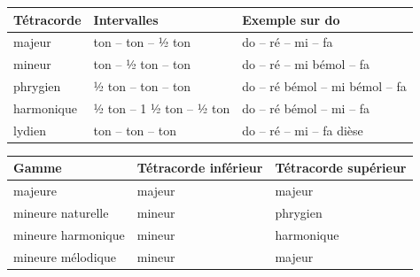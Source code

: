 
\begin{tabular}{@{}l l l@{}}
\toprule
\textbf{Tétracorde} & \textbf{Intervalles} & \textbf{Exemple sur do} \\
\midrule
majeur & ton -- ton -- ½ ton & do -- ré -- mi -- fa \\
mineur & ton -- ½ ton -- ton & do -- ré -- mi bémol -- fa \\
phrygien & ½ ton -- ton -- ton & do -- ré bémol -- mi bémol -- fa \\
harmonique & ½ ton -- 1 ½ ton -- ½ ton & do -- ré bémol -- mi -- fa \\
lydien & ton -- ton -- ton & do -- ré -- mi -- fa dièse \\
\bottomrule
\end{tabular}


\begin{tabular}{@{}l l l@{}}
\toprule
\textbf{Gamme} & \textbf{Tétracorde inférieur} & \textbf{Tétracorde supérieur} \\
\midrule
majeure & majeur & majeur \\
mineure naturelle & mineur & phrygien \\
mineure harmonique & mineur & harmonique \\
mineure mélodique & mineur & majeur \\
\bottomrule
\end{tabular}

